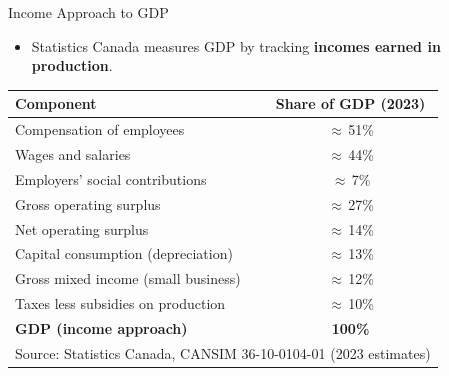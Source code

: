\documentclass[aspectratio=169]{beamer}
\begin{document}
\begin{frame}{Income Approach to GDP}
\transfade
\begin{itemize}
  \item Statistics Canada measures GDP by tracking \textbf{incomes earned in production}.
\end{itemize}
\vspace{0.3em}
\begin{center}
\renewcommand{\arraystretch}{1.35}
\small
\begin{tabular}{lc}
\toprule
\textbf{Component} & \textbf{Share of GDP (2023)} \\
\midrule
Compensation of employees & $\approx$\,51\% \\
\quad Wages and salaries & $\approx$\,44\% \\
\quad Employers' social contributions & $\approx$\,7\% \\
Gross operating surplus & $\approx$\,27\% \\
\quad Net operating surplus & $\approx$\,14\% \\
\quad Capital consumption (depreciation) & $\approx$\,13\% \\
Gross mixed income (small business) & $\approx$\,12\% \\
Taxes less subsidies on production & $\approx$\,10\% \\
\midrule
\textbf{GDP (income approach)} & \textbf{100\%} \\
\bottomrule
\multicolumn{2}{l}{\scriptsize Source: Statistics Canada, CANSIM 36-10-0104-01 (2023 estimates)}
\end{tabular}
\end{center}
\end{frame}
\end{document}
